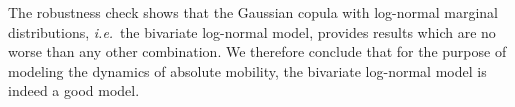 \documentclass[12pt]{article}
\newcommand{\ie}{{\it i.e.}\ }
\numberwithin{equation}{section}
\begin{document}
The robustness check shows that the Gaussian copula with log-normal marginal distributions, \ie the bivariate log-normal model, provides results which are no worse than any other combination. We therefore conclude that for the purpose of modeling the dynamics of absolute mobility, the bivariate log-normal model is indeed a good model.
\end{document}
